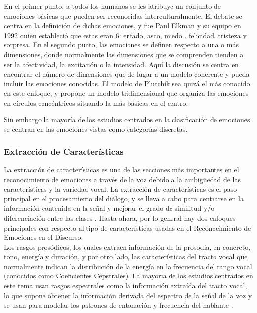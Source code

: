 \documentclass[11pt,a4paper,spanish]{book}
\begin{document}
	En el primer punto, a todos los humanos se les atribuye un conjunto de emociones básicas que pueden ser reconocidas interculturalmente. El debate se centra en la definición de dichas emociones, y fue Paul Elkman y su equipo en 1992 \cite{Ekman1992} quien estableció que estas eran 6: enfado, asco, miedo , felicidad, tristeza y sorpresa.
	En el segundo punto, las emociones se definen respecto a una o más dimensiones, donde normalmente las dimensiones que se comprenden tienden a ser la afectividad, la excitación o la intensidad. Aquí la discusión se centra en encontrar el número de dimensiones que de lugar a un modelo coherente y pueda incluir las emociones conocidas. El modelo de Plutchik \cite{Plutchik2001} sea quizá el más conocido en este enfoque, y propone un modelo tridimensional que organiza las emociones en círculos concéntricos situando la más básicas en el centro. \hfill \break
	
	Sin embargo la mayoría de los estudios centrados en la clasificación de emociones se centran en las emociones vistas como categorías discretas.

	\subsubsection{Extracción de Características}
	La extracción de características es una de las secciones más importantes en el reconocimiento de emociones a través de la voz debido a la ambigüedad de las características y la variedad vocal. La extracción de características es el paso principal en el procesamiento del diálogo, y se lleva a cabo para centrarse en la información contenida en la señal y mejorar el grado de similitud y/o diferenciación entre las clases \cite{Hellbernd2016}. Hasta ahora, por lo general hay dos enfoques principales  con respecto al tipo de características usadas en el Reconocimiento de Emociones en el Discurso:\\
	Los rasgos prosódicos, los cuales extraen información de la prosodia, en concreto, tono, energía y duración, y por otro lado, las características del tracto vocal que normalmente indican la distribución de la energía en la frecuencia del rango vocal (conocidos como Coeficientes Cepstrales).
	La mayoría de los estudios centrados en este tema usan rasgos espectrales como la información extraída del tracto vocal, lo que supone obtener la información derivada del espectro de la señal de la voz y se usan para modelar los patrones de entonación y frecuencia del hablante \cite{Langari2020}.\\
	
\end{document}
